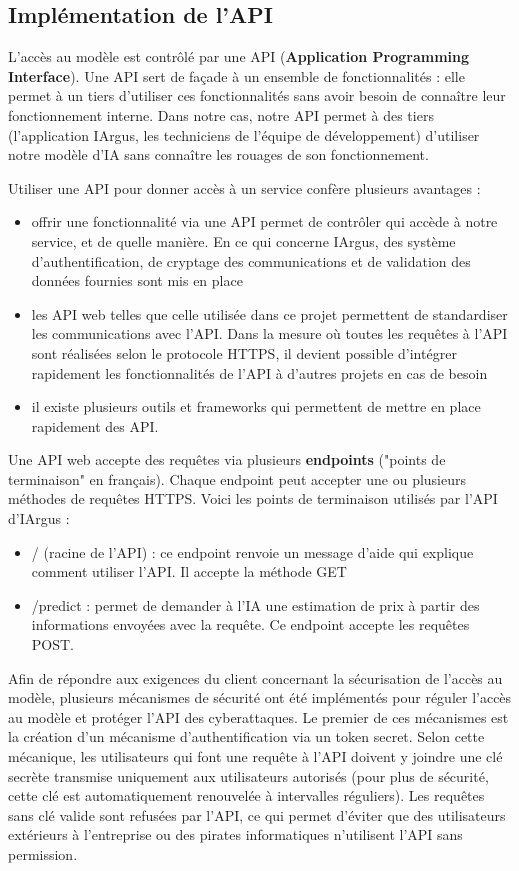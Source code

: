 \documentclass[french]{article}
\begin{document}
    \subsection{Implémentation de l'API}

    L'accès au modèle est contrôlé par une API (\textbf{Application Programming Interface}). Une API sert de façade à un ensemble de fonctionnalités : elle permet à un tiers d'utiliser ces fonctionnalités sans avoir besoin de connaître leur fonctionnement interne. Dans notre cas, notre API permet à des tiers (l'application IArgus, les techniciens de l'équipe de développement) d'utiliser notre modèle d'IA sans connaître les rouages de son fonctionnement.

    Utiliser une API pour donner accès à un service confère plusieurs avantages :
    \begin{itemize}
        \item offrir une fonctionnalité via une API permet de contrôler qui accède à notre service, et de quelle manière. En ce qui concerne IArgus, des système d'authentification, de cryptage des communications et de validation des données fournies sont mis en place
        \item les API web telles que celle utilisée dans ce projet permettent de standardiser les communications avec l'API. Dans la mesure où toutes les requêtes à l'API sont réalisées selon le protocole HTTPS, il devient possible d'intégrer rapidement les fonctionnalités de l'API à d'autres projets en cas de besoin
        \item il existe plusieurs outils et frameworks qui permettent de mettre en place rapidement des API. 
    \end{itemize}
    Une API web accepte des requêtes via plusieurs \textbf{endpoints} ("points de terminaison" en français). Chaque endpoint peut accepter une ou plusieurs méthodes de requêtes HTTPS. Voici les points de terminaison utilisés par l'API d'IArgus :
    \begin{itemize}
        \item / (racine de l'API) : ce endpoint renvoie un message d'aide qui explique comment utiliser l'API. Il accepte la méthode GET
        \item /predict : permet de demander à l'IA une estimation de prix à partir des informations envoyées avec la requête. Ce endpoint accepte les requêtes POST.
    \end{itemize}
    Afin de répondre aux exigences du client concernant la sécurisation de l'accès au modèle, plusieurs mécanismes de sécurité ont été implémentés pour réguler l'accès au modèle et protéger l'API des cyberattaques. Le premier de ces mécanismes est la création d'un mécanisme d'authentification via un token secret. Selon cette mécanique, les utilisateurs qui font une requête à l'API doivent y joindre une clé secrète transmise uniquement aux utilisateurs autorisés (pour plus de sécurité, cette clé est automatiquement renouvelée à intervalles réguliers). Les requêtes sans clé valide sont refusées par l'API, ce qui permet d'éviter que des utilisateurs extérieurs à l'entreprise ou des pirates informatiques n'utilisent l'API sans permission.
\end{document}
